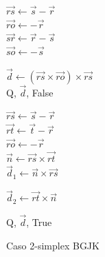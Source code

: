 \begin{figure}[ht]
	\centering

	\begin{minipage}{0.48\textwidth}
		\begin{algorithm}[H]
			\caption{Caso 1-simplex BGJK}

			$\vec{rs} \leftarrow \vec s - \vec r$ \\
			$\vec{ro} \leftarrow -\vec r$ \\
			$\vec{sr} \leftarrow \vec r - \vec s$ \\
			$\vec{so} \leftarrow -\vec s$ \\

			\BlankLine


			$\vec d \leftarrow (\vec{rs} \times \vec{ro}) \times \vec{rs}$ \\

			\Return Q, $\vec d$, False
			\label{alg:bgjk-1simplex}

		\end{algorithm}
	\end{minipage}
	\hfill
	\begin{minipage}{0.48\textwidth}
		\begin{algorithm}[H]
			\caption{Caso 2-simplex BGJK}

			$\vec{rs} \leftarrow \vec s - \vec r$ \\
			$\vec{rt} \leftarrow \vec t - \vec r$ \\
			$\vec{ro} \leftarrow -\vec r$ \\

			$\vec n \leftarrow \vec{rs} \times \vec{rt}$ \\

			$\vec d_1 \leftarrow \vec n \times \vec{rs}$ \\


			$\vec d_2 \leftarrow \vec{rt} \times \vec n$ \\



			\Return Q, $\vec d$, True
			\label{alg:bgjk-2simplex}
		\end{algorithm}
	\end{minipage}
\end{figure}

